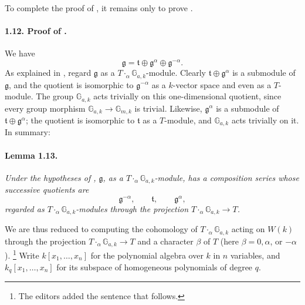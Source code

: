 To complete the proof of , it remains only to prove .



\paragraph{\textbf{1.12. Proof of .}}
We have
\[
  \mathfrak g
    =\mathfrak t\oplus\mathfrak g^\alpha\oplus\mathfrak g^{-\alpha}.
\]
As explained in , regard \(\mathfrak g\) as a
\(T\mathbin{\cdot_\alpha}\mathbb G_{a,k}\)-module. Clearly
\(\mathfrak t\oplus\mathfrak g^\alpha\) is a submodule of
\(\mathfrak g\), and the quotient is isomorphic to
\(\mathfrak g^{-\alpha}\) as a \(k\)-vector space and even as a
\(T\)-module. The group \(\mathbb G_{a,k}\) acts trivially on this
one-dimensional quotient, since every group morphism
\(\mathbb G_{a,k}\to\mathbb G_{m,k}\) is trivial. Likewise,
\(\mathfrak g^\alpha\) is a submodule of
\(\mathfrak t\oplus\mathfrak g^\alpha\); the quotient is isomorphic
to \(\mathfrak t\) as a \(T\)-module, and
\(\mathbb G_{a,k}\) acts trivially on it. In summary:

\paragraph{\textbf{Lemma 1.13.}}
\emph{Under the hypotheses of , \(\mathfrak g\), as a
\(T\mathbin{\cdot_\alpha}\mathbb G_{a,k}\)-module, has a
composition series whose successive quotients are}
\[
  \mathfrak g^{-\alpha},\qquad \mathfrak t,\qquad
  \mathfrak g^\alpha,
\]
\emph{regarded as
\(T\mathbin{\cdot_\alpha}\mathbb G_{a,k}\)-modules through the
projection
\(T\mathbin{\cdot_\alpha}\mathbb G_{a,k}\to T\).}

We are thus reduced to computing the cohomology of
\(T\mathbin{\cdot_\alpha}\mathbb G_{a,k}\) acting on \(W(k)\)
through the projection
\(T\mathbin{\cdot_\alpha}\mathbb G_{a,k}\to T\) and a character
\(\beta\) of \(T\) (here \(\beta=0,\alpha\), or \(-\alpha\)).
\footnote{The editors added the sentence that follows.}
Write \(k[x_1,\ldots,x_n]\) for the polynomial algebra over \(k\)
in \(n\) variables, and \(k_q[x_1,\ldots,x_n]\) for its subspace
of homogeneous polynomials of degree \(q\).

